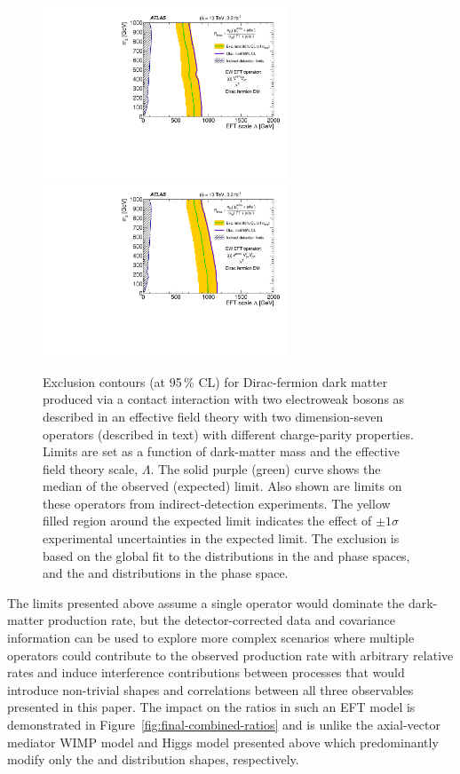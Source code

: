\documentclass[cernpreprint,txfonts,UKenglish,texlive=2016]{\ATLASLATEXPATH atlasdoc}
\begin{document}
\begin{figure}[thbp]
\centering
 \includegraphics[width=0.65\textwidth]{plots/interpretations/VBFEFT/VBF_D7a_limitPlot_CLs_TotalCov_GlobalFit.pdf}
 \includegraphics[width=0.65\textwidth]{plots/interpretations/VBFEFT/VBF_D7c_limitPlot_CLs_TotalCov_GlobalFit.pdf}
\caption{Exclusion contours (at 95\,\% CL) for Dirac-fermion dark matter produced via a contact interaction with two electroweak bosons
as described in an effective field theory with two dimension-seven operators (described in text) with different charge-parity properties.
Limits are set as a function of dark-matter mass and the effective field theory scale, $\Lambda$.
The solid purple (green) curve shows the median of the observed (expected) limit. 
Also shown are limits on these operators from indirect-detection experiments.
The yellow filled region around the expected limit indicates the effect of 
$\pm 1\sigma$ experimental uncertainties in the expected limit.
The exclusion is based on the global fit to the \ptmiss{}
distributions in the \onejet{} and \vbf{} phase spaces, and the \mjj{}
and \dphijj{} distributions in the \vbf{} phase space.
}
\label{fig:exclusions-vbfeft}
\end{figure}

The limits presented above assume a single operator would dominate the dark-matter production rate, 
but the detector-corrected data and covariance information can be used to explore
more complex scenarios where multiple operators could contribute to the observed production rate with arbitrary 
relative rates and induce interference contributions between processes that would 
introduce non-trivial shapes and correlations between all three observables presented in this paper.
The impact on the ratios in such an EFT model is demonstrated in Figure~\ref{fig:final-combined-ratios} and is unlike the
axial-vector mediator WIMP model and Higgs model presented above which predominantly modify 
only the \ptmiss{} and \mjj{} distribution shapes, respectively.
\end{document}
